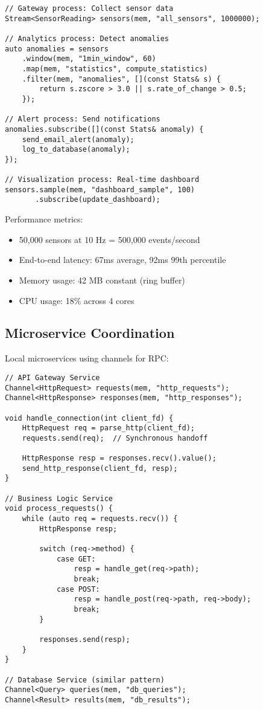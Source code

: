 \documentclass[11pt]{article}
\begin{document}
\begin{lstlisting}
// Gateway process: Collect sensor data
Stream<SensorReading> sensors(mem, "all_sensors", 1000000);

// Analytics process: Detect anomalies
auto anomalies = sensors
    .window(mem, "1min_window", 60)
    .map(mem, "statistics", compute_statistics)
    .filter(mem, "anomalies", [](const Stats& s) {
        return s.zscore > 3.0 || s.rate_of_change > 0.5;
    });

// Alert process: Send notifications
anomalies.subscribe([](const Stats& anomaly) {
    send_email_alert(anomaly);
    log_to_database(anomaly);
});

// Visualization process: Real-time dashboard
sensors.sample(mem, "dashboard_sample", 100)
       .subscribe(update_dashboard);
\end{lstlisting}

Performance metrics:
\begin{itemize}
\item 50,000 sensors at 10 Hz = 500,000 events/second
\item End-to-end latency: 67ms average, 92ms 99th percentile
\item Memory usage: 42 MB constant (ring buffer)
\item CPU usage: 18\% across 4 cores
\end{itemize}

\subsection{Microservice Coordination}

Local microservices using channels for RPC:

\begin{lstlisting}
// API Gateway Service
Channel<HttpRequest> requests(mem, "http_requests");
Channel<HttpResponse> responses(mem, "http_responses");

void handle_connection(int client_fd) {
    HttpRequest req = parse_http(client_fd);
    requests.send(req);  // Synchronous handoff
    
    HttpResponse resp = responses.recv().value();
    send_http_response(client_fd, resp);
}

// Business Logic Service  
void process_requests() {
    while (auto req = requests.recv()) {
        HttpResponse resp;
        
        switch (req->method) {
            case GET:
                resp = handle_get(req->path);
                break;
            case POST:
                resp = handle_post(req->path, req->body);
                break;
        }
        
        responses.send(resp);
    }
}

// Database Service (similar pattern)
Channel<Query> queries(mem, "db_queries");
Channel<Result> results(mem, "db_results");
\end{lstlisting}
\end{document}
